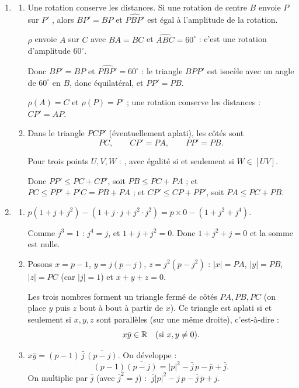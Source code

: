\begin{enumerate}[itemsep=14pt]
  \item\leavevmode
  \begin{enumerate}[itemsep=8pt]
    \item\leavevmode
    \begin{prop}[Rotation]
    Une rotation conserve les distances. Si une rotation de centre $B$ envoie $P$ sur $P'$ , alors $BP'=BP$ et $\widehat{PBP'}$ est égal à l'amplitude de la rotation.
    \end{prop}
    $\rho$ envoie $A$ sur $C$ avec $BA=BC$ et $\widehat{ABC}=60^\circ$ : c'est une rotation d'amplitude $60^\circ$.

    Donc $BP'=BP$ et $\widehat{PBP'}=60^\circ$ : le triangle $BPP'$ est isocèle avec un angle de $60^\circ$ en $B$, donc équilatéral, et $PP'=PB$.

    $\rho(A)=C$ et $\rho(P)=P'$ ; une rotation conserve les distances : $CP'=AP$.
    \item Dans le triangle $PCP'$ (éventuellement aplati), les côtés sont
    \[PC,\qquad CP'=PA,\qquad PP'=PB.\]
    \begin{prop}
    Pour trois points $U,V,W$ : , avec égalité si et seulement si $W\in[UV]$.
    \end{prop}
    Donc $PP'\leq PC+CP'$, soit $PB\leq PC+PA$ ; et $PC\leq PP'+P'C=PB+PA$ ; et $CP'\leq CP+PP'$, soit $PA\leq PC+PB$.
  \end{enumerate}

  \item\leavevmode
  \begin{enumerate}[itemsep=8pt]
    \item $p(1+j+j^2)-(1+j\cdot j+j^2\cdot j^2)=p\times0-(1+j^2+j^4)$.

    Comme $j^3=1$ : $j^4=j$, et $1+j+j^2=0$. Donc $1+j^2+j=0$ et la somme est nulle.
    \item Posons $x=p-1$, $y=j(p-j)$, $z=j^2(p-j^2)$ : $|x|=PA$, $|y|=PB$, $|z|=PC$ (car $|j|=1$) et $x+y+z=0$.

    Les trois nombres forment un triangle fermé de côtés $PA,PB,PC$ (on place $y$ puis $z$ bout à bout à partir de $x$). Ce triangle est aplati si et seulement si $x,y,z$ sont parallèles (sur une même droite), c'est-à-dire :
    \[x\bar y\in\mathbb{R}\quad(\text{si }x,y\neq0).\]
    \item $x\bar y=(p-1)\,\bar j\,\overline{(p-j)}$. On développe :
    \[(p-1)\overline{(p-j)}=|p|^2-\bar j\,p-\bar p+\bar j.\]
    On multiplie par $\bar j$ (avec $\bar j^2=j$) : $\ \bar j|p|^2-j\,p-\bar j\,\bar p+j$.


\end{enumerate}
\end{enumerate}
